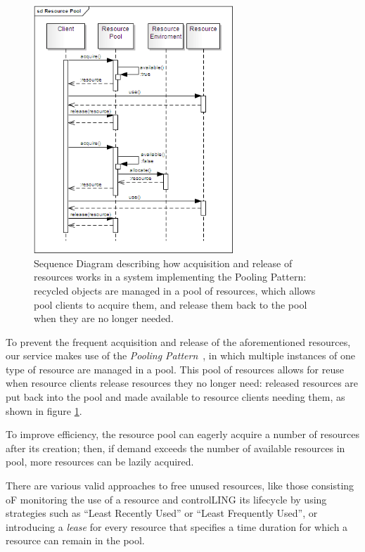 \documentclass[11pt]{article}
\begin{document}
\begin{figure}[!ht]
\begin{center}
\includegraphics[width=7.5cm]{resource_pool}
\end{center}
\caption{Sequence Diagram describing how acquisition and release of resources works in a system implementing the Pooling Pattern: recycled objects are
managed in a pool of resources, which allows pool clients to acquire them, and release them back to the pool when they are no longer needed.}
\label{fig:rp}
\end{figure}

To prevent the frequent acquisition and release of the aforementioned resources, our service makes use of the \emph{Pooling Pattern}~\citep{kircher2001}, 
in which multiple instances of one type of resource are managed in a pool.  This pool of resources allows for reuse when resource clients release resources
they no longer need: released resources are put back into the pool and made available to resource clients needing them, as shown in figure \ref{fig:rp}.

To improve efficiency, the resource pool can eagerly acquire a number of resources after its creation; then, if demand exceeds the number of available resources in
pool, more resources can be lazily acquired.

There are various valid approaches to free unused resources, like those consisting oF monitoring the use of a resource and controlLING its lifecycle by using 
strategies such as ``Least Recently Used'' or ``Least Frequently Used'', or introducing a \emph{lease} for every resource that specifies a time duration for which
a resource can remain in the pool.
\end{document}
